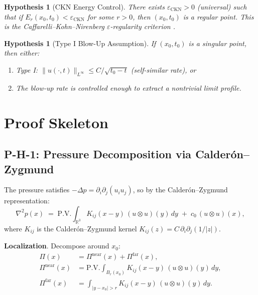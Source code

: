 \documentclass[11pt]{article}
\newtheorem{hypothesis}[lemma]{Hypothesis}
\theoremstyle{definition}
\begin{document}
\begin{hypothesis}[CKN Energy Control]
\label{hyp:CKN}
There exists $\varepsilon_{\mathrm{CKN}} > 0$ (universal) such that if
$E_r(x_0, t_0) < \varepsilon_{\mathrm{CKN}}$ for some $r > 0$, then $(x_0, t_0)$ is a regular point.
This is the Caffarelli--Kohn--Nirenberg $\varepsilon$-regularity criterion \cite{CKN}.
\end{hypothesis}

\begin{hypothesis}[Type I Blow-Up Assumption]
\label{hyp:typeI}
If $(x_0, t_0)$ is a singular point, then either:
\begin{enumerate}
  \item[(a)] Type I: $\|u(\cdot, t)\|_{L^\infty} \leq C / \sqrt{t_0 - t}$ (self-similar rate), or
  \item[(b)] The blow-up rate is controlled enough to extract a nontrivial limit profile.
\end{enumerate}
\end{hypothesis}

\section{Proof Skeleton}

\subsection{P-H-1: Pressure Decomposition via Calder\'on--Zygmund}

The pressure satisfies $-\Delta p = \partial_i \partial_j (u_i u_j)$, so by the Calder\'on--Zygmund representation:
\[
  \nabla^2 p(x) \;=\; \text{P.V.} \int_{\mathbb{R}^3} K_{ij}(x - y)\, (u \otimes u)(y)\, dy
  \;+\; c_0\, (u \otimes u)(x),
\]
where $K_{ij}$ is the Calder\'on--Zygmund kernel $K_{ij}(z) = C \,\partial_i \partial_j (1/|z|)$.

\textbf{Localization}.  Decompose around $x_0$:
\begin{align*}
  \Pi(x) &= \Pi^{\mathrm{near}}(x) + \Pi^{\mathrm{far}}(x), \\
  \Pi^{\mathrm{near}}(x) &= \text{P.V.} \int_{B_r(x_0)} K_{ij}(x-y)\, (u \otimes u)(y)\, dy, \\
  \Pi^{\mathrm{far}}(x) &= \int_{|y - x_0| > r} K_{ij}(x-y)\, (u \otimes u)(y)\, dy.
\end{align*}
\end{document}
